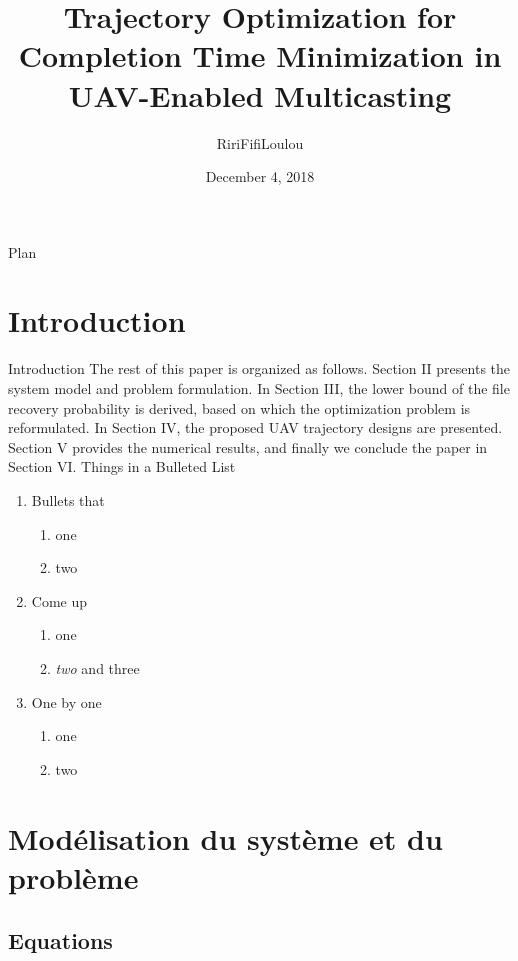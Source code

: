 \documentclass[utf8, a4paper]{beamer}
\title
  [Short Title]
  {Trajectory Optimization for Completion Time Minimization in UAV-Enabled Multicasting}
\author
  [Toto]
  {Riri\quad Fifi\quad Loulou }
\date
  {December 4, 2018}
\institute
  {ENAC}
\begin{document}
\maketitle

\begin{frame}{Plan}

  \tableofcontents

\end{frame}

\section {Introduction}

\begin{frame}
  {Introduction}
The rest of this paper is organized as follows. Section II
presents the system model and problem formulation. In
Section III, the lower bound of the file recovery probability
is derived, based on which the optimization problem is
reformulated. In Section IV, the proposed UAV trajectory
designs are presented. Section V provides the numerical
results, and finally we conclude the paper in Section VI.
  Things in a Bulleted List\pause

  \begin{enumerate}
  \item Bullets that
    \begin{enumerate}
    \item one
    \item two
    \end{enumerate}\pause
  \item Come up
    \begin{enumerate}
    \item one
    \item \emph{two} and three
    \end{enumerate}\pause
  \item One by one
    \begin{enumerate}
    \item one
    \item two
    \end{enumerate}
  \end{enumerate}
\end{frame}


\section{Modélisation du système et du problème}
\subsection{Equations}
\end{document}
